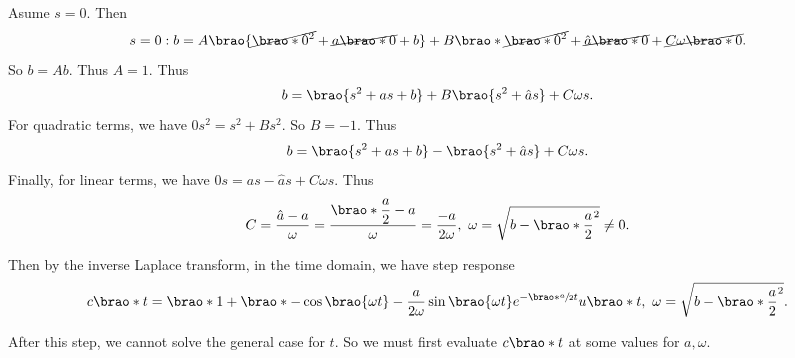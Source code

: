 \documentclass[12pt]{article}
\DeclarePairedDelimiter\brao()%
\begin{document}
\begin{enumerate}
        Asume $s = 0$. Then
        \begin{equation}
            s = 0: b = A\brao{\cancel{\brao*0^2} + \cancel{a\brao*0} + b} + B\brao*{\cancel{\brao*0^2} + \cancel{\hat{a}\brao*0}} + \cancel{C\omega \brao*0}.
        \end{equation}
        So $b = Ab$. Thus $A = 1$. Thus
        \begin{equation}
            b = \brao{s^2 + as + b} + B\brao{s^2 + \hat{a}s} + C\omega s.
        \end{equation}
        For quadratic terms, we have $0s^2 = s^2 + Bs^2$. So $B = -1$. Thus
        \begin{equation}
            b = \brao{s^2 + as + b} - \brao{s^2 + \hat{a}s} + C\omega s.
        \end{equation}
        Finally, for linear terms, we have $0s = as - \hat{a}s + C\omega s$. Thus
        \begin{equation}
            C = \frac{\hat{a} - a}\omega
            = \frac{\displaystyle\brao*{\frac{a}2} - a}\omega
            = \frac{-a}{2\omega},\ 
            \omega = \sqrt{b - \brao*{\frac{a}2}^2} \not= 0.
        \end{equation}

        Then by the inverse Laplace transform, in the time domain, we have step response
        \begin{equation}
            \begin{aligned}
                c\brao*t = \brao*{1 + \brao*{-\cos\brao{\omega t} - \frac{a}{2\omega} \sin\brao{\omega t} }{e^{-\brao*{\sfrac{a}2}t}}}u\brao*t,\ 
                \omega = \sqrt{b - \brao*{\frac{a}2}^2}.
            \end{aligned}
        \end{equation}

        After this step, we cannot solve the general case for $t$. So we must first evaluate $c\brao*t$ at some values for $a, \omega$.


\end{enumerate}
\end{document}
